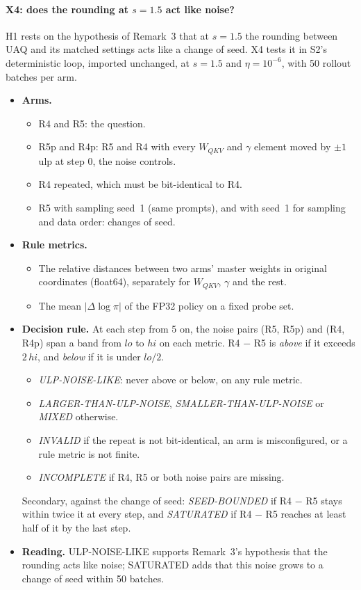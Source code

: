 \documentclass[11pt]{article}
\begin{document}
\paragraph{X4: does the rounding at \texorpdfstring{$s=1.5$}{s = 1.5} act like noise?}
H1 rests on the hypothesis of Remark~3 that at $s=1.5$ the rounding between UAQ and its matched settings acts like a change of seed. X4 tests it in S2's deterministic loop, imported unchanged, at $s=1.5$ and $\eta=10^{-6}$, with 50 rollout batches per arm.
\begin{itemize}
\item \textbf{Arms.}
  \begin{itemize}
  \item R4 and R5: the question.
  \item R5p and R4p: R5 and R4 with every $W_{QKV}$ and $\gamma$ element moved by $\pm1$ ulp at step 0, the noise controls.
  \item R4 repeated, which must be bit-identical to R4.
  \item R5 with sampling seed~1 (same prompts), and with seed~1 for sampling and data order: changes of seed.
  \end{itemize}
\item \textbf{Rule metrics.}
  \begin{itemize}
  \item The relative distances between two arms' master weights in original coordinates (float64), separately for $W_{QKV}$, $\gamma$ and the rest.
  \item The mean $|\Delta\log\pi|$ of the FP32 policy on a fixed probe set.
  \end{itemize}
\item \textbf{Decision rule.} At each step from 5 on, the noise pairs (R5, R5p) and (R4, R4p) span a band from $lo$ to $hi$ on each metric. R4 $-$ R5 is \emph{above} if it exceeds $2\,hi$, and \emph{below} if it is under $lo/2$.
  \begin{itemize}
  \item \emph{ULP-NOISE-LIKE}: never above or below, on any rule metric.
  \item \emph{LARGER-THAN-ULP-NOISE}, \emph{SMALLER-THAN-ULP-NOISE} or \emph{MIXED} otherwise.
  \item \emph{INVALID} if the repeat is not bit-identical, an arm is misconfigured, or a rule metric is not finite.
  \item \emph{INCOMPLETE} if R4, R5 or both noise pairs are missing.
  \end{itemize}
  Secondary, against the change of seed: \emph{SEED-BOUNDED} if R4 $-$ R5 stays within twice it at every step, and \emph{SATURATED} if R4 $-$ R5 reaches at least half of it by the last step.
\item \textbf{Reading.} ULP-NOISE-LIKE supports Remark~3's hypothesis that the rounding acts like noise; SATURATED adds that this noise grows to a change of seed within 50 batches.
\end{itemize}
\end{document}
